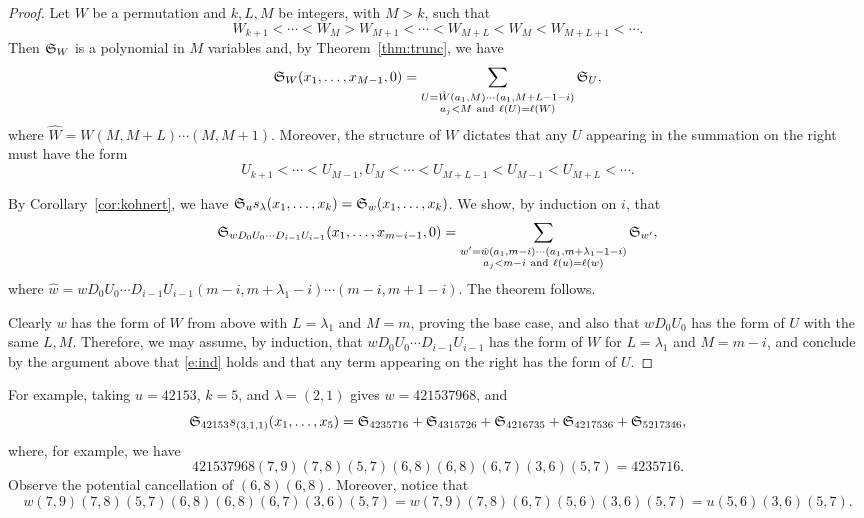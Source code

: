 \documentclass[11pt]{amsart}
\theoremstyle{definition}
\theoremstyle{remark}
\numberwithin{equation}{section}
\newcommand{\schubert}{\ensuremath\mathfrak{S}}
\begin{document}
\begin{proof}
  Let $W$ be a permutation and $k,L,M$ be integers, with $M>k$, such that 
  \[ W_{k+1} < \cdots < W_{M} > W_{M+1} < \cdots < W_{M+L} < W_{M} < W_{M+L+1} < \cdots . \]
  Then $\schubert_W$ is a polynomial in $M$ variables and, by Theorem~\ref{thm:trunc}, we have
  \begin{equation}
    \schubert_{W}(x_1,\ldots,x_{M-1},0) = \sum_{\substack{U = \hat{W} (a_1,M) \cdots (a_1,M+L-1-i) \\ a_j < M \ \mathrm{and} \ \ell(U) = \ell(W)}} \schubert_{U},
  \end{equation}
  where $\hat{W} = W (M,M+L) \cdots (M,M+1)$. Moreover, the structure of $W$ dictates that any $U$ appearing in the summation on the right must have the form
  \[ U_{k+1} < \cdots < U_{M-1} , U_{M} < \cdots < U_{M+L-1} < U_{M-1} < U_{M+L} < \cdots . \]

  By Corollary~\ref{cor:kohnert}, we have $\schubert_u s_{\lambda}(x_1,\ldots,x_k) = \schubert_w(x_1,\ldots,x_k)$.   We show, by induction on $i$, that
  \begin{equation}
    \schubert_{w D_0 U_0 \cdots D_{i-1} U_{i-1}}(x_1,\ldots,x_{m-i-1},0) = \sum_{\substack{w' = \hat{w} (a_1,m-i) \cdots (a_1,m+\lambda_1-1-i) \\ a_j < m-i \ \mathrm{and} \ \ell(u) = \ell(w)}} \schubert_{w'},
    \label{e:ind}
  \end{equation}
  where $\hat{w} = w D_0 U_0 \cdots D_{i-1} U_{i-1} (m-i,m+\lambda_1-i) \cdots (m-i,m+1-i)$. The theorem follows.

  Clearly $w$ has the form of $W$ from above with $L = \lambda_1$ and $M=m$, proving the base case, and also that $w D_0 U_0$ has the form of $U$ with the same $L,M$. Therefore, we may assume, by induction, that $w D_0 U_0 \cdots D_{i-1} U_{i-1}$ has the form of $W$ for $L=\lambda_1$ and $M=m-i$, and conclude by the argument above that \eqref{e:ind} holds and that any term appearing on the right has the form of $U$. 
\end{proof}

For example, taking $u = 42153$, $k=5$, and $\lambda = (2,1)$ gives $w=421537968$, and
\begin{displaymath}
  \schubert_{42153} s_{(3,1,1)}(x_1,\ldots,x_5) = \schubert_{4235716}+\schubert_{4315726}+\schubert_{4216735}+\schubert_{4217536}+\schubert_{5217346}, 
\end{displaymath}
where, for example, we have
\[ 421537968 (7,9)(7,8)(5,7)(6,8)(6,8)(6,7)(3,6)(5,7) = 4235716.\]
Observe the potential cancellation of $(6,8)(6,8)$. Moreover, notice that
\[ w (7,9)(7,8)(5,7)(6,8)(6,8)(6,7)(3,6)(5,7) = w (7,9)(7,8)(6,7)(5,6)(3,6)(5,7) = u (5,6)(3,6)(5,7). \]
\end{document}
